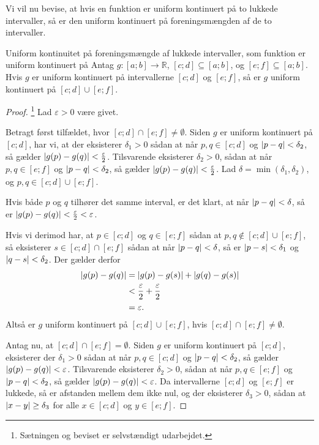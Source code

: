 Vi vil nu bevise, at hvis en funktion er uniform kontinuert på to lukkede intervaller, så er den uniform kontinuert på foreningsmængden af de to intervaller.

\begin{theorem}[label=theo:uniform_fælles]{Uniform kontinuitet på foreningsmængde af lukkede intervaller, som funktion er uniform kontinuert på}{}
  Antag $g:[a;b]\to \mathbb{R}$, $[c;d] \subseteq [a;b]$, og $[e;f]\subseteq [a;b]$.
  Hvis $g$ er uniform kontinuert på intervallerne $[c;d]$ og $[e;f]$, så er $g$ uniform kontinuert på $[c;d] \cup [e;f]$.
\end{theorem}
\begin{proof} 
  \footnote{Sætningen og beviset er selvstændigt udarbejdet.}
  Lad $\varepsilon >0$ være givet. 

  Betragt først tilfældet, hvor $[c;d]\cap [e;f]\neq \emptyset $.
  Siden $g$ er uniform kontinuert på $[c;d]$, har vi, at der eksisterer $\delta _1>0$ sådan at når $p, q \in [c;d]$ og $\abs{p-q} <\delta _2$, så gælder $\abs{g(p)-g(q)} < \frac{\varepsilon }{2} $. 
  Tilsvarende eksisterer $\delta _2>0$, sådan at når $p, q \in [e;f]$ og $\abs{p-q} < \delta _2 $, så gælder $\abs{g(p)-g(q)} <\frac{\varepsilon }{2}$. 
  Lad $\delta =\min (\delta _1, \delta _2)$, og $p, q \in [c;d] \cup [e;f]$.

  \noindent Hvis både $p$ og $q$ tilhører det samme interval, er det klart, at når $\abs{p-q}<\delta  $, så er $\abs{g(p)-g(q)} <\frac{\varepsilon }{2} < \varepsilon  $. 

  \noindent Hvis vi derimod har, at $p \in [c;d]$ og $q \in [e;f]$ sådan at $p, q \not\in [c;d] \cup [e;f]$, så eksisterer $s \in [c;d] \cap [e;f]$ sådan at når $\abs{p-q} <\delta $, så er $\abs{p-s} <\delta _1$ og $\abs{q-s} <\delta _2$.
  Der gælder derfor
  \begin{equation*}
  \begin{split}
    \abs{g(p)-g(q)} &= \abs{g(p)-g(s)} + \abs{g(q)-g(s)} \\
  &< \frac{\varepsilon }{2} + \frac{\varepsilon }{2} \\
  &=\varepsilon.
  \end{split}
  \end{equation*}
  Altså er $g$ uniform kontinuert på $[c;d] \cup [e;f]$, hvis $[c;d] \cap [e;f]\neq \emptyset $.

  Antag nu, at $[c;d] \cap [e;f] = \emptyset $.
Siden $g$ er uniform kontinuert på $[c;d]$, eksisterer der $\delta _1>0$ sådan at når $p, q \in [c;d]$ og $\abs{p-q} <\delta _2$, så gælder $\abs{g(p)-g(q)} < \varepsilon$.
Tilsvarende eksisterer $\delta _2>0$, sådan at når $p, q \in [e;f]$ og $\abs{p-q} < \delta _2 $, så gælder $\abs{g(p)-g(q)} <\varepsilon$. 
  Da intervallerne $[c;d]$ og $[e;f]$ er lukkede, så er afstanden mellem dem ikke nul, og der eksisterer $\delta _3>0$, sådan at $\abs{x-y}\geq \delta _3$ for alle $x \in [c;d]$ og $y \in [e;f]$.


\end{proof}

